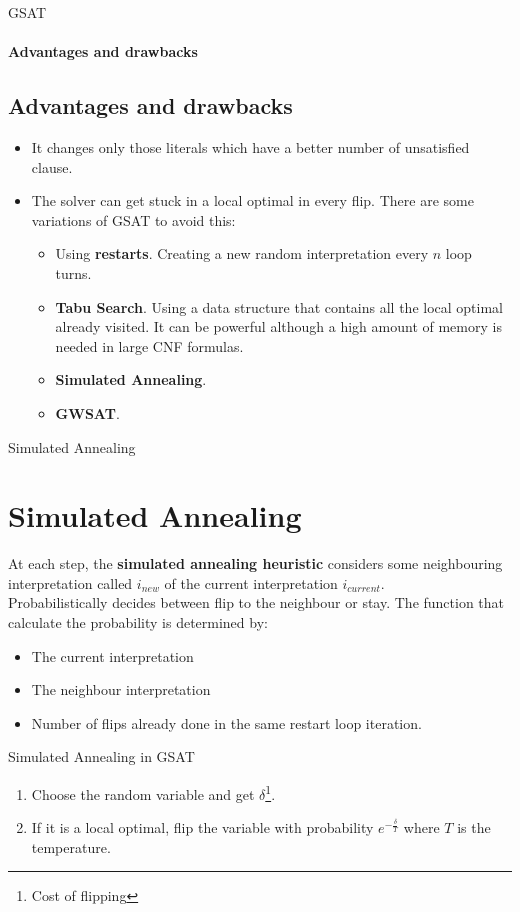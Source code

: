 \documentclass{beamer}
\begin{document}
\begin{frame}{GSAT}
\framesubtitle{Advantages and drawbacks}
\subsection{Advantages and drawbacks}
\begin{itemize}
	\item It changes only those literals which have a better number of unsatisfied clause. 
	\item The solver can get stuck in a local optimal in every flip. There are some variations of GSAT to avoid this:
	\begin{itemize}
		\item Using \textbf{restarts}. Creating a new random interpretation every $n$ loop turns.
		\item \textbf{Tabu Search}. Using a data structure that contains all the local optimal already visited. It can be powerful although a high amount of memory is needed in large CNF formulas.
		\item \textbf{Simulated Annealing}.
		\item \textbf{GWSAT}.
		
	\end{itemize}
\end{itemize}
\end{frame}

\begin{frame}{Simulated Annealing}
\section{Simulated Annealing}
\begin{flushleft}

At each step, the \textbf{simulated annealing heuristic }considers some neighbouring interpretation called $i_{new}$ of the current interpretation $i_{current}$.
\\
Probabilistically decides between flip to the neighbour or stay. The function that calculate the probability is determined by:
\end{flushleft}
\begin{itemize}
	\item The current interpretation
	\item The neighbour interpretation
	\item Number of flips already done in the same restart loop iteration.
\end{itemize}
\end{frame}
\begin{frame}{Simulated Annealing in GSAT}
\begin{enumerate}
	\item Choose the random variable and get $\delta$\footnote{Cost of flipping}.
	\item If it is a local optimal, flip the variable with probability $e^{-\frac{\delta}{T}}$ where $T$ is the temperature.
\end{enumerate}

\end{frame}
\end{document}
